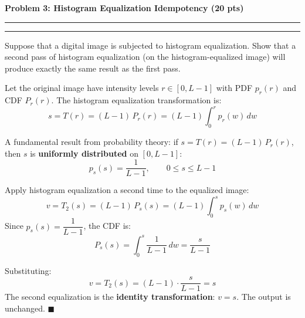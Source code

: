 \documentclass[12pt]{article}
\newcommand{\question}[1]{%
  \clearpage
  \vspace{0.5cm}
  {\noindent\normalsize \textbf{#1}}
  \vspace{0.2cm}
  \hrule
  \vspace{0.1cm}
  \hrule
  \vspace{0.3cm}
}
\begin{document}

\question{Problem 3: Histogram Equalization Idempotency (20 pts)}\label{quest:3}

Suppose that a digital image is subjected to histogram equalization. Show that a second pass of histogram equalization (on the histogram-equalized image) will produce exactly the same result as the first pass.

\vspace{0.5cm}

\begin{stepbox}
Let the original image have intensity levels $r \in [0, L-1]$ with PDF $p_r(r)$ and CDF $P_r(r)$. The histogram equalization transformation is:
\[
s = T(r) = (L-1)\, P_r(r) = (L-1) \int_0^r p_r(w)\, dw
\]
\end{stepbox}

\begin{stepbox}
A fundamental result from probability theory: if $s = T(r) = (L-1)\,P_r(r)$, then $s$ is \textbf{uniformly distributed} on $[0, L-1]$:
\[
p_s(s) = \frac{1}{L-1}, \qquad 0 \leq s \leq L-1
\]
\end{stepbox}

\begin{stepbox}
Apply histogram equalization a second time to the equalized image:
\[
v = T_2(s) = (L-1)\, P_s(s) = (L-1) \int_0^s p_s(w)\, dw
\]
Since $p_s(s) = \dfrac{1}{L-1}$, the CDF is:
\[
P_s(s) = \int_0^s \frac{1}{L-1}\, dw = \frac{s}{L-1}
\]
\end{stepbox}

\begin{stepbox}
Substituting:
\[
v = T_2(s) = (L-1) \cdot \frac{s}{L-1} = s
\]
The second equalization is the \textbf{identity transformation}: $v = s$. The output is unchanged. $\blacksquare$
\end{stepbox}
\end{document}
